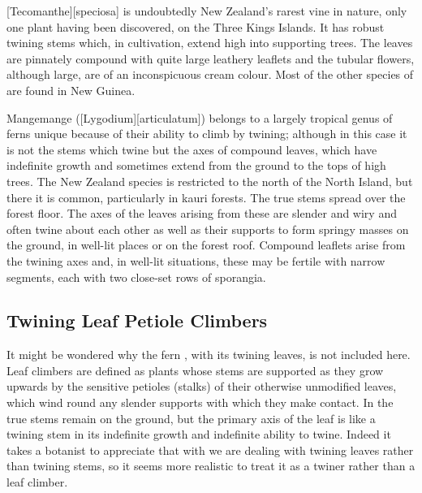 [Tecomanthe][speciosa] is undoubtedly New Zealand's rarest vine in nature, only one plant having been discovered, on the Three Kings Islands.
It has robust twining stems which, in cultivation, extend high into supporting trees.
The leaves are pinnately compound with quite large leathery leaflets and the tubular flowers, although large, are of an inconspicuous cream colour.
Most of the other species of  are found in New Guinea.

Mangemange ([Lygodium][articulatum]) belongs to a largely tropical genus of ferns unique because of their ability to climb by twining; although in this case it is not the stems which twine but the axes of compound leaves, which have indefinite growth and sometimes extend from the ground to the tops of high trees.
The New Zealand species is restricted to the north of the North Island, but there it is common, particularly in kauri forests.
The true stems spread over the forest floor.
The axes of the leaves arising from these are slender and wiry and often twine about each other as well as their supports to form springy masses on the ground, in well-lit places or on the forest roof.
Compound leaflets arise from the twining axes and, in well-lit situations, these may be fertile with narrow segments, each with two close-set rows of sporangia.

\subsection{Twining Leaf Petiole Climbers}

It might be wondered why the fern , with its twining leaves, is not included here.
Leaf climbers are defined as plants whose stems are supported as they grow upwards by the sensitive petioles (stalks) of their otherwise unmodified leaves, which wind round any slender supports with which they make contact.
In  the true stems remain on the ground, but the primary axis of the leaf is like a twining stem in its indefinite growth and indefinite ability to twine.
Indeed it takes a botanist to appreciate that with  we are dealing with twining leaves rather than twining stems, so it seems more realistic to treat it as a twiner rather than a leaf climber.

